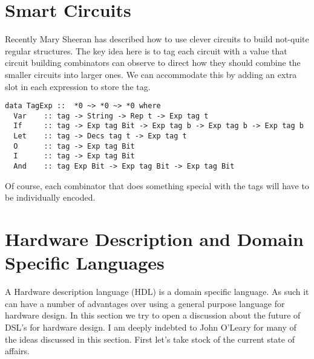 \documentclass[10pt,twoside]{article}
\begin{document}
\section{Smart Circuits}
Recently Mary Sheeran has described how to use clever circuits\cite{clever}
to build not-quite regular structures. The key idea here is to tag each
circuit with a value that circuit building combinators can observe
to direct how they should combine the smaller circuits into
larger ones. We can accommodate this by adding an extra slot
in each expression to store the tag.

\begin{verbatim}
data TagExp ::  *0 ~> *0 ~> *0 where
  Var    :: tag -> String -> Rep t -> Exp tag t
  If     :: tag -> Exp tag Bit -> Exp tag b -> Exp tag b -> Exp tag b
  Let    :: tag -> Decs tag t -> Exp tag t
  O      :: tag -> Exp tag Bit
  I      :: tag -> Exp tag Bit
  And    :: tag Exp Bit -> Exp tag Bit -> Exp tag Bit
\end{verbatim}
Of course, each combinator that does something special with the
tags will have to be individually encoded.



\section{Hardware Description and Domain Specific Languages}

A Hardware description language (HDL) is a domain specific language. As
such it can have a number of advantages over using a
general purpose language for hardware design. In this section we try
to open a discussion about the future of DSL's for hardware design. I am
deeply indebted to John O'Leary for many of the ideas discussed
in this section. First let's take stock of the current state of affairs.
\end{document}
